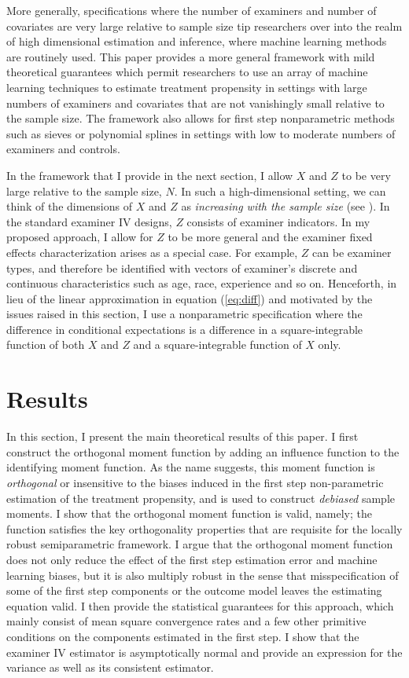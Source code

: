 More generally, specifications where the number of examiners and number of covariates are very large relative to sample size tip researchers over into the realm of high dimensional estimation and inference, where machine learning methods are routinely used. This paper provides a more general framework with mild theoretical guarantees which permit researchers to use an array of machine learning techniques to estimate treatment propensity in settings with large numbers of examiners and covariates that are not vanishingly small  relative to the sample size. The framework also allows for first step nonparametric methods such as sieves or polynomial splines in settings with low to moderate numbers of examiners and controls. 

In the framework that I provide in the next section, I allow $X$ and $Z$ to be very large relative to the sample size, $N$. In such a high-dimensional setting, we can think of the dimensions of $X$ and $Z$ as \textit{increasing with the sample size} (see \citet{chernozhukov2018double}). In the standard examiner IV designs, $Z$ consists of examiner indicators. In my proposed approach, I allow for $Z$ to be more general and the examiner fixed effects characterization arises as a special case. For example,  $Z$ can be examiner types, and therefore be identified with vectors of examiner's discrete and continuous characteristics such as age, race, experience and so on.  Henceforth, in lieu of the linear approximation in equation (\ref{eq:diff}) and motivated by the issues raised in this section, I use a nonparametric specification where the difference in conditional expectations is a difference in a square-integrable function of both $X$ and $Z$ and a square-integrable function of $X$ only.


\section{Results}

In this section, I present the main theoretical results of this paper. I first construct the orthogonal moment function by adding an influence function to the identifying moment function. As the name suggests, this moment function is \textit{orthogonal} or insensitive to the biases induced in the first step non-parametric estimation of the treatment propensity, and is used to construct \textit{debiased} sample moments. I show that the orthogonal moment function is valid, namely; the function satisfies the key orthogonality properties that are requisite for the locally robust semiparametric framework. I argue that the orthogonal moment function does not only reduce the effect of the first step estimation error and machine learning biases, but it is also multiply robust in the sense that misspecification of some of the first step components or the outcome model leaves the estimating equation valid. I then provide the statistical guarantees for this approach, which mainly consist of mean square convergence rates and a few other primitive conditions on the components estimated in the first step. I show that the examiner IV estimator is asymptotically normal and provide an expression for the variance as well as its consistent estimator.

